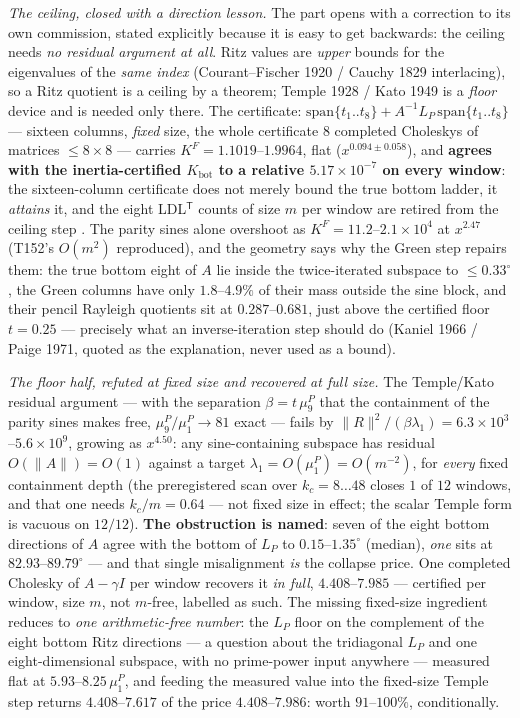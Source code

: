 \documentclass[11pt,a4paper]{article}
\begin{document}
\emph{The ceiling, closed with a direction lesson.} The part opens with a correction to its
own commission, stated explicitly because it is easy to get backwards: the ceiling needs
\emph{no residual argument at all}. Ritz values are \emph{upper} bounds for the eigenvalues
of the \emph{same index} (Courant--Fischer 1920 / Cauchy 1829 interlacing), so a Ritz
quotient is a ceiling by a theorem; Temple 1928 / Kato 1949 is a \emph{floor} device and is
needed only there. The certificate:
$\mathrm{span}\{t_1..t_8\}+A^{-1}L_P\,\mathrm{span}\{t_1..t_8\}$ --- sixteen columns,
\emph{fixed} size, the whole certificate $8$ completed Choleskys of matrices
$\le8\times8$ --- carries $K^F=1.1019$--$1.9964$, flat ($x^{0.094\pm0.058}$), and
\textbf{agrees with the inertia-certified $K_{\mathrm{bot}}$ to a relative
$5.17\times10^{-7}$ on every window}: the sixteen-column certificate does not merely bound
the true bottom ladder, it \emph{attains} it, and the eight LDL$^{\mathsf T}$ counts of
size $m$ per window are retired from the ceiling step
. The parity sines alone overshoot as
$K^F=11.2$--$2.1\times10^{4}$ at $x^{2.47}$ (T152's $O(m^2)$ reproduced), and the geometry
says why the Green step repairs them: the true bottom eight of $A$ lie inside the
twice-iterated subspace to $\le0.33^\circ$, the Green columns have only
$1.8$--$4.9\%$ of their mass outside the sine block, and their pencil Rayleigh quotients
sit at $0.287$--$0.681$, just above the certified floor $t=0.25$ --- precisely what an
inverse-iteration step should do (Kaniel 1966 / Paige 1971, quoted as the explanation,
never used as a bound).

\emph{The floor half, refuted at fixed size and recovered at full size.} The Temple/Kato
residual argument --- with the separation $\beta=t\,\mu^P_9$ that the containment of the
parity sines makes free, $\mu^P_9/\mu^P_1\to81$ exact --- fails by
$\|R\|^2/(\beta\lambda_1)=6.3\times10^{3}$--$5.6\times10^{9}$, growing as $x^{4.50}$: any
sine-containing subspace has residual $O(\|A\|)=O(1)$ against a target
$\lambda_1=O(\mu^P_1)=O(m^{-2})$, for \emph{every} fixed containment depth (the
preregistered scan over $k_c=8\ldots48$ closes $1$ of $12$ windows, and that one needs
$k_c/m=0.64$ --- not fixed size in effect; the scalar Temple form is vacuous on $12/12$).
\textbf{The obstruction is named}: seven of the eight bottom directions of $A$ agree with
the bottom of $L_P$ to $0.15$--$1.35^\circ$ (median), \emph{one} sits at
$82.93$--$89.79^\circ$ --- and that single misalignment \emph{is} the collapse price.
One completed Cholesky of $A-\gamma I$ per window recovers it \emph{in full},
$4.408$--$7.985$ --- certified per window, size $m$, not $m$-free, labelled as such. The
missing fixed-size ingredient reduces to \emph{one arithmetic-free number}: the $L_P$
floor on the complement of the eight bottom Ritz directions --- a question about the
tridiagonal $L_P$ and one eight-dimensional subspace, with no prime-power input anywhere
--- measured flat at $5.93$--$8.25\,\mu^P_1$, and feeding the measured value into the
fixed-size Temple step returns $4.408$--$7.617$ of the price $4.408$--$7.986$: worth
$91$--$100\%$, conditionally.
\end{document}
